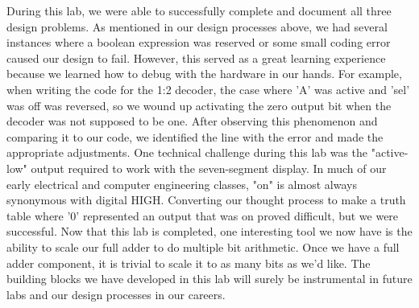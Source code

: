 \documentclass[11pt]{article}
\begin{document}
During this lab, we were able to successfully complete and document all three design problems. As mentioned in our design processes above, we had several instances where a boolean expression was reserved or some small coding error caused our design to fail. However, this served as a great learning experience because we learned how to debug with the hardware in our hands. For example, when writing the code for the 1:2 decoder, the case where 'A' was active and 'sel' was off was reversed, so we wound up activating the zero output bit when the decoder was not supposed to be one. After observing this phenomenon and comparing it to our code, we identified the line with the error and made the appropriate adjustments. One technical challenge during this lab was the "active-low" output required to work with the seven-segment display. In much of our early electrical and computer engineering classes, "on" is almost always synonymous with digital HIGH. Converting our thought process to make a truth table where '0' represented an output that was on proved difficult, but we were successful. Now that this lab is completed, one interesting tool we now have is the ability to scale our full adder to do multiple bit arithmetic. Once we have a full adder component, it is trivial to scale it to as many bits as we'd like. The building blocks we have developed in this lab will surely be instrumental in future labs and our design processes in our careers.

\pagebreak
\end{document}
